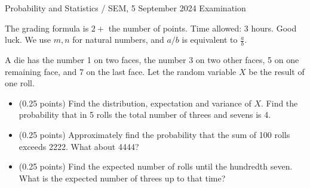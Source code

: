 \documentclass[a4paper]{report}
\begin{document}
\noindent Probability and Statistics / SEM, 5 September 2024 \hfill Examination
\hrulefill
\begin{it}
The grading formula is $2+$ the number of points. Time allowed: 3 hours. Good luck.
We use $m,n$ for natural numbers, and $a/b$ is equivalent to $\frac{a}{b}$.
\end{it}
\begin{problem}
A die has the number 1 on two faces, the number 3 on two other faces, 5 on one remaining face, and 7 on the last face. Let the random variable $X$ be the result of one roll.
\begin{itemize}
\item (0.25 points) Find the distribution, expectation and variance of $X$. Find the probability that in 5 rolls the total number of threes and sevens is 4.
\item (0.25 points) Approximately find the probability that the sum of 100 rolls exceeds 2222. What about 4444?
\item (0.25 points) Find the expected number of rolls until the hundredth seven. What is the expected number of threes up to that time?
\end{itemize}
\end{problem}
\end{document}
